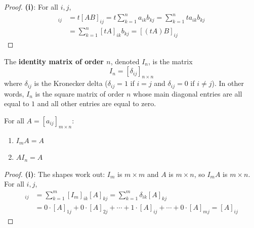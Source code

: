 \begin{proof}
    \textbf{(i)}: For all $i,j$,
    \begin{align*}
    [t(AB)]_{ij} &= t[AB]_{ij} = t\sum_{k=1}^{n} a_{ik}b_{kj} = \sum_{k=1}^{n} ta_{ik}b_{kj} \\
    &= \sum_{k=1}^{n} [tA]_{ik}b_{kj} = [(tA)B]_{ij}
    \end{align*}
\end{proof}

\begin{definition}\label{def:identity-matrix}
    The \textbf{identity matrix of order $n$}, denoted $I_n$, is the matrix
    \[
    I_n = [\delta_{ij}]_{n \times n}
    \]
    where $\delta_{ij}$ is the Kronecker delta ($\delta_{ij} = 1$ if $i = j$ and $\delta_{ij} = 0$ if $i \neq j$). In other words, $I_n$ is the square matrix of order $n$ whose main diagonal entries are all equal to $1$ and all other entries are equal to zero.
\end{definition}

\begin{theorem}\label{thm:identity-property}
    For all $A = [a_{ij}]_{m \times n}$:
    \begin{enumerate}[label=(\roman*)]
        \item $I_m A = A$
        \item $A I_n = A$
    \end{enumerate}
\end{theorem}

\begin{proof}
    \textbf{(i)}: The shapes work out: $I_m$ is $m \times m$ and $A$ is $m \times n$, so $I_m A$ is $m \times n$. For all $i,j$,
    \begin{align*}
    [I_m A]_{ij} &= \sum_{k=1}^{m} [I_m]_{ik}[A]_{kj} = \sum_{k=1}^{m} \delta_{ik}[A]_{kj} \\
    &= 0 \cdot [A]_{1j} + 0 \cdot [A]_{2j} + \cdots + 1 \cdot [A]_{ij} + \cdots + 0 \cdot [A]_{mj} = [A]_{ij}
    \end{align*}
\end{proof}